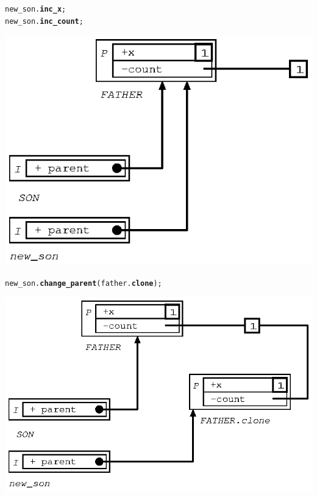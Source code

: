 \documentclass[11pt]{mybook}
\begin{document}
\begin{alltt}
  new\_son.{\bf{}inc\_x};
  new\_son.{\bf{}inc\_count};
\end{alltt}
\begin{center}
\includegraphics[scale=1.0]{figures/inherit_plus_2} 
\end{center}

\begin{alltt}
  new\_son.{\bf{}change\_parent} ({\sc{}father}.{\bf{}clone});
\end{alltt}
\begin{center}
\includegraphics[scale=1.0]{figures/inherit_plus_3} 
\end{center}
\end{document}
